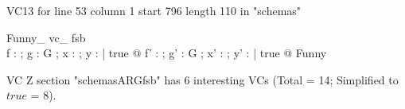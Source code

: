 \documentclass{article}
\begin{document}
VC13 for line 53 column 1 start 796 length 110 in "schemas"
\begin{theorem}{ Funny\_ vc\_ fsb}\\
 \forall f : \nat \fun \nat ; g : G ; x : \nat ; y : \power \nat | true @ \exists f' : \nat \fun \nat ; g' : G ; x' : \nat ; y' : \power \nat | true @ Funny \\

\end{theorem}



 VC Z section "schemasARGfsb" has $6$ interesting VCs (Total = 14; Simplified to $true$ = 8).



\end{document}
